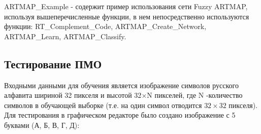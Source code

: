 ARTMAP_Example - содержит пример использования сети Fuzzy ARTMAP, используя вышеперечисленные функции, в нем непосредственно используются функции: RT_Complement_Code, ARTMAP_Create_Network, ARTMAP_Learn, ARTMAP_Classify.



\subsection{Тестирование ПМО}


Входными данными для обучения является изображение символов русского алфавита шириной 32 пикселя и высотой 32$\times$N пикселей, где N -количество символов в обучающей выборке (т.е. на один символ отводится $32\times 32$ пикселя). Для тестирования в графическом редакторе было создано изображение с 5 буквами (А, Б, В, Г, Д):
\begin{center}

\end{center}
